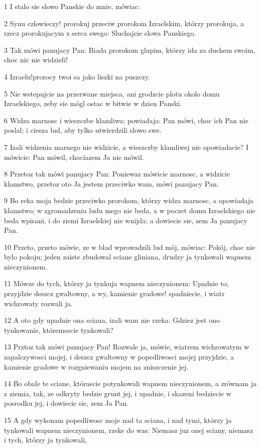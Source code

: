 \par 1 I stalo sie slowo Panskie do mnie, mówiac:
\par 2 Synu czlowieczy! prorokuj przeciw prorokom Izraelskim, którzy prorokuja, a rzecz prorokujacym z serca swego: Sluchajcie slowa Panskiego.
\par 3 Tak mówi panujacy Pan: Biada prorokom glupim, którzy ida za duchem swoim, choc nic nie widzieli!
\par 4 Izraelu!prorocy twoi sa jako liszki na puszczy.
\par 5 Nie wstepujcie na przerwane miejsca, ani grodzcie plotu okolo domu Izraelskiego, zeby sie mógl ostac w bitwie w dzien Panski.
\par 6 Widza marnosc i wieszczbe klamliwa; powiadaja: Pan mówi, choc ich Pan nie poslal; i ciesza lud, aby tylko utwierdzili slowo swe.
\par 7 Izali widzenia marnego nie widzicie, a wieszczby klamliwej nie opowiadacie? I mówicie: Pan mówil, chociazem Ja nie mówil.
\par 8 Przetoz tak mówi panujacy Pan: Poniewaz mówicie marnosc, a widzicie klamstwo, przetoz oto Ja jestem przeciwko wam, mówi panujacy Pan.
\par 9 Bo reka moja bedzie przeciwko prorokom, którzy widza marnosc, a opowiadaja klamstwo; w zgromadzeniu ludu mego nie beda, a w poczet domu Izraelskiego nie beda wpisani, i do ziemi Izraelskiej nie wnijda; a dowiecie sie, zem Ja panujacy Pan.
\par 10 Przeto, przeto mówie, ze w blad wprowadzili lud mój, mówiac: Pokój, choc nie bylo pokoju; jeden zaiste zbudowal sciane gliniana, drudzy ja tynkowali wapnem nieczynionem.
\par 11 Mówze do tych, którzy ja tynkuja wapnem nieczynionem: Upadnie to, przyjdzie deszcz gwaltowny, a wy, kamienie gradowe! spadniecie, i wiatr wichrowaty rozwali ja.
\par 12 A oto gdy upadnie ona sciana, izali wam nie rzeka: Gdziez jest ono tynkowanie, któremescie tynkowali?
\par 13 Prztoz tak mówi panujacy Pan! Rozwale ja, mówie, wiatrem wichrowatym w zapalczywosci mojej, i deszcz gwaltowny w popedliwosci mojej przyjdzie, a kamienie gradowe w rozgniewaniu mojem na zniszczenie jej.
\par 14 Bo obale te sciane, którascie potynkowali wapnem nieczynionem, a zrównam ja z ziemia, tak, ze odkryty bedzie grunt jej, i upadnie, i skazeni bedziecie w posrodku jej, i dowiecie sie, zem Ja Pan.
\par 15 A gdy wykonam popedliwosc moje nad ta sciana, i nad tymi, którzy ja tynkowali wapnem nieczynionem, rzeke do was: Niemasz juz onej sciany, niemasz i tych, którzy ja tynkowali,
